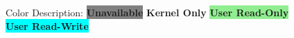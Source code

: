 \begin{figure}

    \newcommand{\memsection}[6][lrtb]{%
        \bytefieldsetup{bitheight=#4\baselineskip}%
        \bitbox[]{10}{
            \texttt{#2} \\ %
            \vspace{#4\baselineskip}
            \vspace{-2\baselineskip}
            \vspace{-#4pt}
            \texttt{#3} %
        }
        \bitbox[#1]{16}[bgcolor=#5]{\small #6}
    }

    \newcommand{\memgap}[2][lrtb]{
        \bytefieldsetup{bitheight=#2\baselineskip}
        \bitbox[#1]{16}[bgcolor=gray]{\small Gap}
    }

    Color Description:
    \colorbox{gray}{\textbf{Unavailable}}
    \colorbox{lightred}{\textbf{Kernel Only}}
    \colorbox{lightgreen}{\textbf{User Read-Only}}
    \colorbox{cyan}{\textbf{User Read-Write}}


\end{figure}
